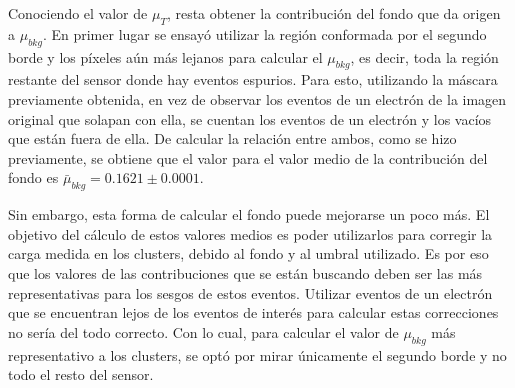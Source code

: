 Conociendo el valor de $\mu_{T}$, resta obtener la contribución del fondo que da origen a $\mu_{bkg}$. En primer lugar se ensayó utilizar la región conformada por el segundo borde y los píxeles aún más lejanos para calcular el $\mu_{bkg}$, es decir, toda la región restante del sensor donde hay eventos espurios. Para esto, utilizando la máscara previamente obtenida, en vez de observar los eventos de un electrón de la imagen original que solapan con ella, se cuentan los eventos de un electrón y los vacíos que están fuera de ella. De calcular la relación entre ambos, como se hizo previamente, se obtiene que el valor para el valor medio de la contribución del fondo es $\bar{\mu}_{bkg} = 0.1621 \pm 0.0001$. 

Sin embargo, esta forma de calcular el fondo puede mejorarse un poco más. El objetivo del cálculo de estos valores medios es poder utilizarlos para corregir la carga medida en los clusters, debido al fondo y al umbral utilizado. Es por eso que los valores de las contribuciones que se están buscando deben ser las más representativas para los sesgos de estos eventos. Utilizar eventos de un electrón que se encuentran lejos de los eventos de interés para calcular estas correcciones no sería del todo correcto. Con lo cual, para calcular el valor de $\mu_{bkg}$ más representativo a los clusters, se optó por mirar únicamente el segundo borde y no todo el resto del sensor.

